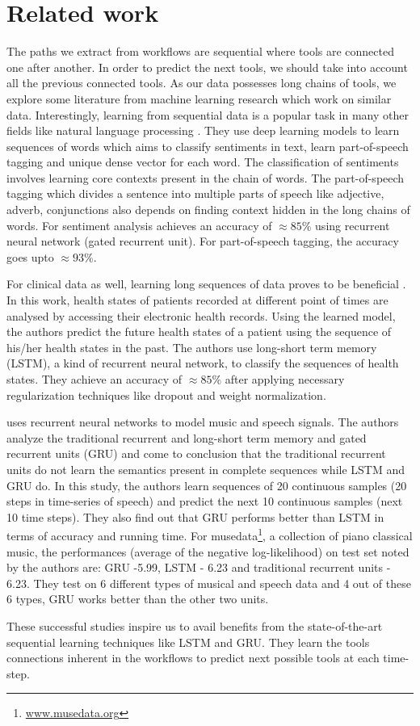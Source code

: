 \chapter{Related work}\label{chap:previous_work_wf}

The paths we extract from workflows are sequential where tools are connected one after another. In order to predict the next tools, we should take into account all the previous connected tools. As our data possesses long chains of tools, we explore some literature from machine learning research which work on similar data. Interestingly, learning from sequential data is a popular task in many other fields like natural language processing \cite{0001KYS17, LiQYL16}. They use deep learning models to learn sequences of words which aims to classify sentiments in text, learn part-of-speech tagging and unique dense vector for each word. The classification of sentiments involves learning core contexts present in the chain of words. The part-of-speech tagging which divides a sentence into multiple parts of speech like adjective, adverb, conjunctions also depends on finding context hidden in the long chains of words. For sentiment analysis \cite{0001KYS17} achieves an accuracy of $\approx 85\%$ using recurrent neural network (gated recurrent unit). For part-of-speech tagging, the accuracy goes upto $\approx 93\%$. 

For clinical data as well, learning long sequences of data proves to be beneficial \cite{LiptonKEW15}. In this work, health states of patients recorded at different point of times are analysed by accessing their electronic health records. Using the learned model, the authors predict the future health states of a patient using the sequence of his/her health states in the past. The authors use long-short term memory (LSTM), a kind of recurrent neural network, to classify the sequences of health states. They achieve an accuracy of $\approx 85\%$ after applying necessary regularization techniques like dropout and weight normalization.

\cite{ChungGCB14, BoulangerICML2012} uses recurrent neural networks to model music and speech signals. The authors analyze the traditional recurrent and long-short term memory and gated recurrent units (GRU) and come to conclusion that the traditional recurrent units do not learn the semantics present in complete sequences while LSTM and GRU do. In this study, the authors learn sequences of 20 continuous samples (20 steps in time-series of speech) and predict the next 10 continuous samples (next 10 time steps). They also find out that GRU performs better than LSTM in terms of accuracy and running time. For musedata\footnote{\url{www.musedata.org}}, a collection of piano classical music, the performances (average of the negative log-likelihood) on test set noted by the authors are: GRU -5.99, LSTM - 6.23 and traditional recurrent units - 6.23. They test on 6 different types of musical and speech data and 4 out of these 6 types, GRU works better than the other two units.

These successful studies inspire us to avail benefits from the state-of-the-art sequential learning techniques like LSTM and GRU. They learn the tools connections inherent in the workflows to predict next possible tools at each time-step.

